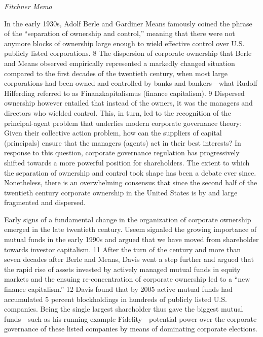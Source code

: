 \documentclass[
]{book}
\begin{document}
\emph{Fitchner Memo}

In the early 1930s, Adolf Berle and Gardiner Means famously coined the phrase of the ``separation of ownership and control,'' meaning that there were not anymore blocks of ownership large enough to wield effective control over U.S. publicly listed corporations. 8 The dispersion of corporate ownership that Berle and Means observed empirically represented a markedly changed situation compared to the first decades of the twentieth century, when most large corporations had been owned and controlled by banks and bankers---what Rudolf Hilferding referred to as Finanzkapitalismus (finance capitalism). 9 Dispersed ownership however entailed that instead of the owners, it was the managers and directors who wielded control. This, in turn, led to the recognition of the principal-agent problem that underlies modern corporate governance theory: Given their collective action problem, how can the suppliers of capital (principals) ensure that the managers (agents) act in their best interests? In response to this question, corporate governance regulation has progressively shifted towards a more powerful position for shareholders. The extent to which the separation of ownership and control took shape has been a debate ever since. Nonetheless, there is an overwhelming consensus that since the second half of the twentieth century corporate ownership in the United States is by and large fragmented and dispersed.

Early signs of a fundamental change in the organization of corporate ownership emerged in the late twentieth century. Useem signaled the growing importance of mutual funds in the early 1990s and argued that we have moved from shareholder towards investor capitalism. 11 After the turn of the century and more than seven decades after Berle and Means, Davis went a step further and argued that the rapid rise of assets invested by actively managed mutual funds in equity markets and the ensuing re-concentration of corporate ownership led to a ``new finance capitalism.'' 12 Davis found that by 2005 active mutual funds had accumulated 5 percent blockholdings in hundreds of publicly listed U.S. companies. Being the single largest shareholder thus gave the biggest mutual funds---such as his running example Fidelity---potential power over the corporate governance of these listed companies by means of dominating corporate elections.
\end{document}
